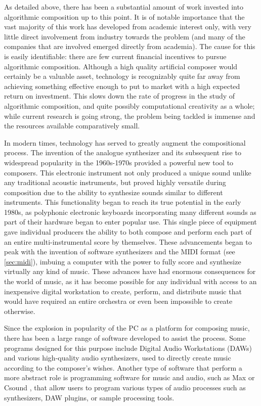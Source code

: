 \documentclass[ author={Stephen Livermore-Tozer},
				supervisor={Dr. Peter Flach},
				degree={MEng},
				title={Algorithmic Co-composition Using Machine Learning},
				subtitle={},
				type={research},
				year={2016} ]{dissertation}
\begin{document}
	As detailed above, there has been a substantial amount of work invested into algorithmic composition up to this point. It is of notable importance that the vast majority of this work has developed from academic interest only, with very little direct involvement from industry towards the problem (and many of the companies that are involved emerged directly from academia). The cause for this is easily identifiable: there are few current financial incentives to pursue algorithmic composition. Although a high quality artificial composer would certainly be a valuable asset, technology is recognizably quite far away from achieving something effective enough to put to market with a high expected return on investment. This slows down the rate of progress in the study of algorithmic composition, and quite possibly computational creativity as a whole; while current research is going strong, the problem being tackled is immense and the resources available comparatively small. 
	
	In modern times, technology has served to greatly augment the compositional process. The invention of the 
	analogue synthesizer and its subsequent rise to widespread popularity in the 1960s-1970s provided a powerful new tool to composers. This electronic instrument not only produced a unique sound unlike any traditional acoustic instruments, but proved highly versatile during composition due to the ability to synthesize sounds similar to different instruments. This functionality began to reach its true potential in the early 1980s, as polyphonic electronic keyboards incorporating many different sounds as part of their hardware began to enter popular use. This single piece of equipment gave individual producers the ability to both compose and perform each part of an entire multi-instrumental score by themselves. These advancements began to peak with the invention of software synthesizers and the MIDI format (see \ref{sec:midi}), imbuing a computer with the power to fully score and synthesize virtually any kind of music. These advances have had enormous consequences for the world of music, as it has become possible for any individual with access to an inexpensive digital workstation to create, perform, and distribute music that would have required an entire orchestra or even been impossible to create otherwise.
	
	Since the explosion in popularity of the PC as a platform for composing music, there has been a large range of software developed to assist the process. Some programs designed for this purpose include Digital Audio Workstations (DAWs) and various high-quality audio synthesizers, used to directly create music according to the composer's wishes. Another type of software that perform a more abstract role is programming software for music and audio, such as Max \cite{puckette2002max} or Csound \cite{boulanger2000csound}, that allow users to program various types of audio processes such as synthesizers, DAW plugins, or sample processing tools. 
	
\end{document}
